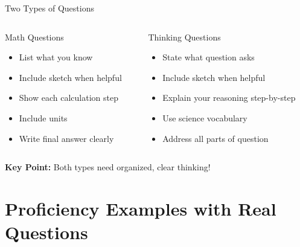 \documentclass{beamer}
\begin{document}
\begin{frame}{Two Types of Questions}
\begin{columns}
\begin{column}{0.5\textwidth}
\begin{block}{Math Questions}
\begin{itemize}
\item List what you know \pause
\item Include sketch when helpful \pause
\item Show each calculation step \pause
\item Include units \pause
\item Write final answer clearly
\end{itemize}
\end{block}
\end{column} \pause
\begin{column}{0.5\textwidth}
\begin{block}{Thinking Questions}
\begin{itemize}
\item State what question asks \pause
\item Include sketch when helpful \pause
\item Explain your reasoning step-by-step \pause
\item Use science vocabulary \pause
\item Address all parts of question
\end{itemize}
\end{block}
\end{column}
\end{columns}

\pause
\vspace{0.5cm}
\textbf{Key Point:} Both types need organized, clear thinking!
\end{frame}






\section{Proficiency Examples with Real Questions}
\end{document}
